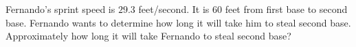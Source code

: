 \documentclass{ximera}
\author{Carolyn Johns}
\begin{document}
\begin{exercise}
Fernando's sprint speed is $29.3$ feet/second. It is $60$ feet from first base to second base. Fernando wants to determine how long it will take him to steal second base.  Approximately how long it will take Fernando to steal second base?

\begin{multipleChoice}
\end{multipleChoice}


\end{exercise}
\end{document}

